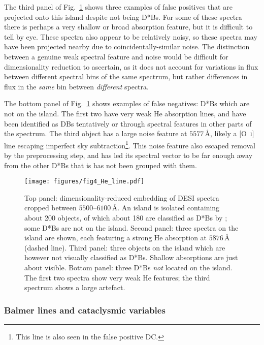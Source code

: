 \documentclass[fleqn,usenatbib]{mnras}
\begin{document}
The third panel of Fig.~\ref{fig:He_lines} shows three examples of false positives that are projected onto this island despite not being D*Bs.
For some of these spectra there is perhaps a very shallow or broad absorption feature, but it is difficult to tell by eye.
These spectra also appear to be relatively noisy, so these spectra may have been projected nearby due to coincidentally-similar noise.
The distinction between a genuine weak spectral feature and noise would be difficult for dimensionality reduction to ascertain, as it does not account for variations in flux between different spectral bins of the same spectrum, but rather differences in flux in the \textit{same} bin between \textit{different} spectra.

The bottom panel of Fig.~\ref{fig:He_lines} shows examples of false negatives: D*Bs which are not on the island.
The first two have very weak He absorption lines, and have been identified as DBs tentatively or through spectral features in other parts of the spectrum.
The third object has a large noise feature at $5577\,\text{\AA}$, likely a [O~\textsc{i}] line escaping imperfect sky subtraction\footnote{
    This line is also seen in the false positive DC.
}.
This noise feature also escaped removal by the preprocessing step, and has led its spectral vector to be far enough away from the other D*Bs that is has not been grouped with them.

\begin{figure}
\centering
\texttt{[image: figures/fig4\_He\_line.pdf]}
\caption{
    Top panel: dimensionality-reduced embedding of DESI spectra cropped between $5500$--$6100\,\text{\AA}$.
    An island is isolated containing about 200 objects, of which about 180 are classified as D*Bs by \citet{manser24}; some D*Bs are not on the island.
    Second panel: three spectra on the island are shown, each featuring a strong He absorption at $5876\,\text{\AA}$ (dashed line).
    Third panel: three objects on the island which are however not visually  classified as D*Bs.
    Shallow absorptions are just about visible.
    Bottom panel: three D*Bs \textit{not} located on the island.
    The first two spectra show very weak He features; the third spectrum shows a large artefact.
}
\label{fig:He_lines}
\end{figure}

\subsubsection{Balmer lines and cataclysmic variables}
\label{sec:CVs}
\end{document}
